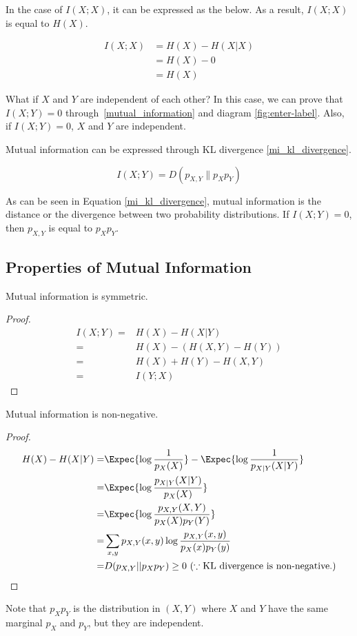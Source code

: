 \documentclass{article}
\begin{document}
In the case of $I(X;X)$, it can be expressed as the below. 
As a result, $I(X;X)$ is equal to $H(X)$.

\begin{equation}
\label{x;x}
\begin{split}
    I(X;X) &= H(X) - H(X|X) \\
    &= H(X) - 0 \\
    &= H(X)
\end{split}
\end{equation}

What if $X$ and $Y$ are independent of each other?
In this case, we can prove that $I(X;Y) = 0$ through~\eqref{mutual_information} and diagram \ref{fig:enter-label}.
Also, if $I(X; Y) = 0$, $X$ and $Y$ are independent.

Mutual information can be expressed through KL divergence \eqref{mi_kl_divergence}.

\begin{equation}
    \label{mi_kl_divergence}
    I(X;Y) = D(p_{X,Y} \parallel p_Xp_Y)
\end{equation}

As can be seen in Equation \eqref{mi_kl_divergence}, mutual information is the distance or the divergence between two probability distributions. 
If $I(X;Y) = 0$, then $p_{X,Y}$ is equal to $p_Xp_Y$.


\subsection{Properties of Mutual Information}
\begin{theorem} Mutual information is symmetric.
\end{theorem}
\begin{proof}
    \begin{align}
        I(X;Y) =& H(X)-H(X|Y)\\
        =& H(X)-(H(X,Y)-H(Y))\\
        =& H(X)+H(Y)-H(X,Y)\\
        =& I(Y;X)
    \end{align}
\end{proof}

\begin{theorem} Mutual information is non-negative.
\end{theorem}
\begin{proof}
    \begin{align}
        H(X)-H(X|Y) =& \Expec{\log \frac{1}{p_X(X)}}-\Expec{\log \frac{1}{p_{X|Y}(X|Y)}}\\
        =& \Expec{\log \frac{p_{X|Y}(X|Y)}{p_X(X)}}\\
        =& \Expec{\log \frac{p_{X,Y}(X,Y)}{p_X(X)p_Y(Y)}}\\
        =& \sum_{x,y} {p_{X,Y}(x,y)}\log \frac{p_{X,Y}(x,y)}{p_X(x)p_Y(y)}\\
        =& D(p_{X,Y}||p_Xp_Y) \geq 0\ (\because \textnormal{KL divergence is non-negative.})
    \end{align}
\end{proof}
Note that $p_Xp_Y$ is the distribution in $(X, Y)$ where $X$ and $Y$ have the same marginal $p_X$ and $p_Y$, but they are independent.
\end{document}
